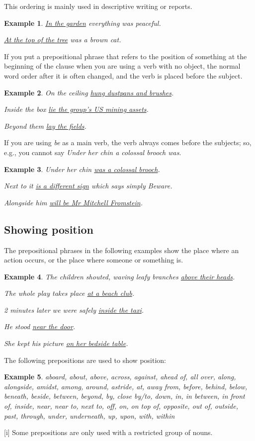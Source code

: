 \documentclass[oneside]{book}
\numberwithin{equation}{section}
\newtheorem{example}{Example}[section]
\begin{document}
This ordering is mainly used in descriptive writing or reports.
\begin{example}
    \underline{In the garden} everything was peaceful.
    
    \underline{At the top of the tree} was a brown cat.
\end{example}
%
\noindent{} If you put a prepositional phrase that refers to the position of something at the beginning of the clause when you are using a verb with no object, the normal word order after it is often changed, and the verb is placed before the subject.
\begin{example}
    On the ceiling \underline{hung dustpans and brushes}.
    
    Inside the box \underline{lie the group's US mining assets}.
    
    Beyond them \underline{lay the fields}.
\end{example}
If you are using \textit{be} as a main verb, the verb always comes before the subjects; so, e.g., you cannot say \textit{Under her chin a colossal brooch was}.
\begin{example}
    Under her chin \underline{was a colossal brooch}.
    
    Next to it \underline{is a different sign} which says simply Beware.
    
    Alongside him \underline{will be Mr Mitchell Fromstein}.
\end{example}

\subsection{Showing position}
\noindent{} The prepositional phrases in the following examples show the place where an action occurs, or the place where someone or something is.
\begin{example}
    The children shouted, waving leafy branches \underline{above their heads}.
    
    The whole play takes place \underline{at a beach club}.
    
    2 minutes later we were safely \underline{inside the taxi}.
    
    He stood \underline{near the door}.
    
    She kept his picture \underline{on her bedside table}.
\end{example}
%
\noindent{} The following prepositions are used to show position:
\begin{example}
    aboard, about, above, across, against, ahead of, all over, along, alongside, amidst, among, around, astride, at, away from, before, behind, below, beneath, beside, between, beyond, by, close by/to, down, in, in between, in front of, inside, near, near to, next to, off, on, on top of, opposite, out of, outside, past, through, under, underneath, up, upon, with, within
\end{example}
%
\noindent{} [i] Some prepositions are only used with a restricted group of nouns.
\end{document}
